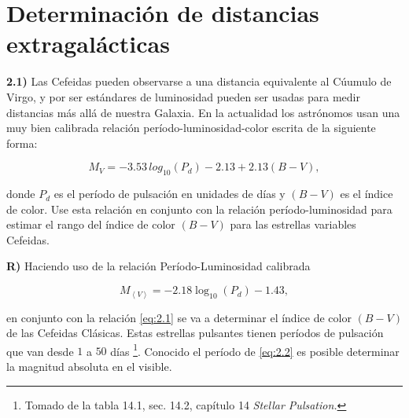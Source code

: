 \documentclass[paper=a4, fontsize=10pt]{scrartcl} %
\begin{document}
\section{Determinación de distancias extragalácticas}

{\bf{2.1)}} Las Cefeidas pueden observarse a una distancia equivalente al Cúumulo de Virgo, y por ser
estándares de luminosidad pueden ser usadas para medir distancias más allá de nuestra Galaxia. En la actualidad los astrónomos usan una muy bien calibrada relación período-luminosidad-color escrita de la siguiente forma:

\begin{equation} \label{eq:2.1} 
M_V = -3.53 \, log_{10}(P_d) - 2.13 + 2.13 (B-V),
\end{equation}

donde $P_d$ es el período de pulsación en unidades de días y $(B-V)$ es el índice de color. Use esta relación en conjunto con la relación período-luminosidad para estimar el rango del índice de color $(B-V)$ para las estrellas variables Cefeidas.

{\bf{R)}} Haciendo uso de la relación Período-Luminosidad calibrada 

\begin{equation} \label{eq:2.2}
M_{\left<V\right>} = -2.18 \log_{10} (P_d) -1.43,
\end{equation}

en conjunto con la relación \eqref{eq:2.1} se va a determinar  el índice de color $(B-V)$ de las Cefeidas Clásicas. Estas estrellas pulsantes tienen períodos de pulsación que van desde $1$ a $50$ días \footnote{Tomado de la tabla 14.1, sec. 14.2, capítulo 14 {\textit{Stellar Pulsation.}}}. Conocido el período de \eqref{eq:2.2} es posible determinar la magnitud absoluta en el visible. 

\vspace{0.2cm} 
\end{document}
